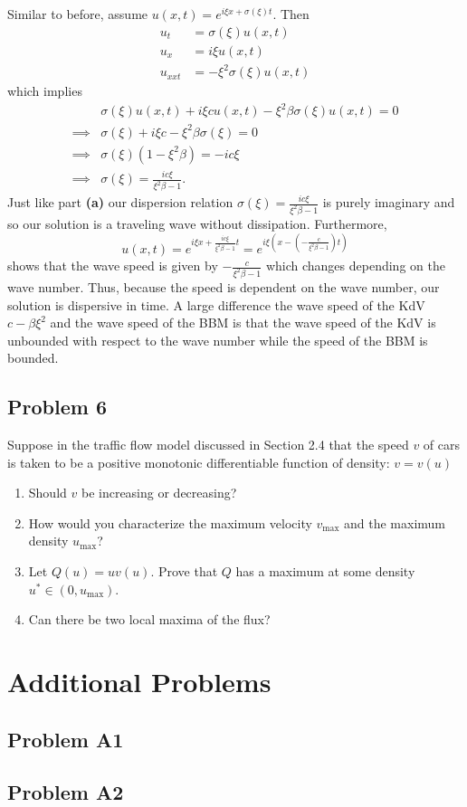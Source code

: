 \documentclass[a4paper,12pt]{article}
\begin{document}
\begin{enumerate}[label = \textbf{(\alph*)}]
		Similar to before, assume $ u(x,t) = e^{i\xi x + \sigma(\xi)t} $. Then
		\begin{align*}
			u_t        &= \sigma(\xi) u(x,t) \\
			u_x       &= i \xi u(x,t) \\
			u_{xxt} &= -\xi^2 \sigma(\xi) u(x,t)
		\end{align*}
		which implies
		\begin{align*}
			& \sigma(\xi)u(x,t) + i \xi c u(x,t) - \xi^2\beta \sigma(\xi) u(x,t) = 0 \\
			\implies & \sigma(\xi) + i \xi c - \xi^2\beta \sigma(\xi) = 0 \\
			\implies & \sigma(\xi)(1 - \xi^2 \beta) = -i c \xi \\
			\implies & \sigma(\xi) = \frac{i c \xi}{\xi^2 \beta - 1}.
		\end{align*}
		Just like part \textbf{(a)} our dispersion relation $ \sigma(\xi) = \frac{i c \xi}{\xi^2 \beta - 1} $ is purely imaginary and so our solution is a traveling wave without dissipation. Furthermore,
		\[
			u(x,t) = e^{i \xi x + \frac{i c \xi}{\xi^2 \beta - 1} t} = e^{i \xi \left (x -\left (- \frac{c}{\xi^2 \beta - 1}\right ) t\right )}
		\]
		shows that the wave speed is given by $ -\frac{c}{\xi^2 \beta - 1} $ which changes depending on the wave number. Thus, because the speed is dependent on the wave number, our solution is dispersive in time. A large difference the wave speed of the KdV $ c - \beta \xi^2 $ and the wave speed of the BBM is that the wave speed of the KdV is unbounded with respect to the wave number while the speed of the BBM is bounded.
	\end{enumerate}

\subsection*{Problem 6}
	Suppose in the traffic flow model discussed in Section 2.4 that the speed $ v $ of cars is taken to be a positive monotonic differentiable function of density: $ v = v(u) $
	\begin{enumerate}[label = \textbf{(\alph*)}]
		\item Should $ v $ be increasing or decreasing?
		
		\item How would you characterize the maximum velocity $ v_\text{max} $ and the maximum density $ u_\text{max} $?
		
		\item Let $ Q(u) = u v(u) $. Prove that $ Q $ has a maximum at some density $ u^* \in (0,u_\text{max})$.
		
		\item Can there be two local maxima of the flux?
	\end{enumerate}

\section*{Additional Problems}
\subsection*{Problem A1}

\subsection*{Problem A2}
\end{document}
